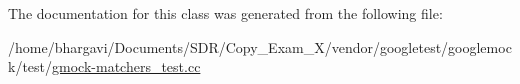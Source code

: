 The documentation for this class was generated from the following file\+:\begin{DoxyCompactItemize}
\item 
/home/bhargavi/\+Documents/\+S\+D\+R/\+Copy\+\_\+\+Exam\+\_\+X/vendor/googletest/googlemock/test/\hyperlink{gmock-matchers__test_8cc}{gmock-\/matchers\+\_\+test.\+cc}\end{DoxyCompactItemize}
